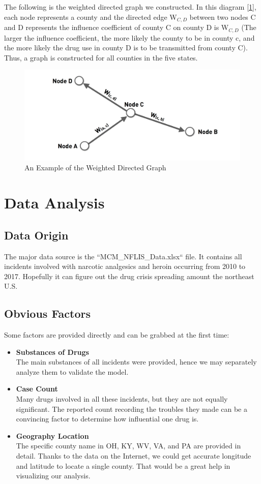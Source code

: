 \documentclass{mcmthesis}
\begin{document}
The following is the weighted directed graph we constructed. In this diagram [\ref{graph}], each node represents a county and the directed edge W$_{C,D}$ between two nodes C and D represents the influence coefficient of county C on county D is W$_{C,D}$ (The larger the influence coefficient, the more likely the county to be in county c, and the more likely the drug use in county D is to be transmitted from county C). Thus, a graph is constructed for all counties in the five states.
\begin{figure}[h]
	\centering
	\includegraphics[width=15cm]{figure-release/Model1.ExampleMap.png}
	\caption{An Example of the Weighted Directed Graph}\label{graph}
\end{figure}

\section{Data Analysis}

\subsection{Data Origin}
The major data source is the ``MCM\_NFLIS\_Data.xlsx`` file. It contains all incidents involved with narcotic analgesics and heroin occurring from 2010 to 2017. Hopefully it can figure out the drug crisis spreading amount the northeast U.S.

\subsection{Obvious Factors}
Some factors are provided directly and can be grabbed at the first time:
\begin{itemize}
	\item \textbf{Substances of Drugs}\\
	The main substances of all incidents were provided, hence we may separately analyze them to validate the model.
	\item \textbf{Case Count}\\
	Many drugs involved in all these incidents, but they are not equally significant. The reported count recording the troubles they made can be a convincing factor to determine how influential one drug is.
	\item \textbf{Geography Location}\\
	The specific county name in OH, KY, WV, VA, and PA are provided in detail. Thanks to the data on the Internet\cite{3}, we could get accurate longitude and latitude to locate a single county. That would be a great help in visualizing our analysis.
\end{itemize}
\end{document}
